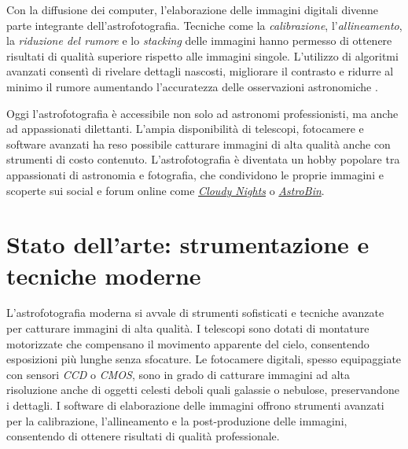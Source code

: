 Con la diffusione dei computer, l'elaborazione delle immagini digitali divenne parte integrante dell'astrofotografia. Tecniche come la \textit{calibrazione}, l'\textit{allineamento}, la \textit{riduzione del rumore} e lo \textit{stacking} delle immagini hanno permesso di ottenere risultati di qualità superiore rispetto alle immagini singole. L'utilizzo di algoritmi avanzati consentì di rivelare dettagli nascosti, migliorare il  contrasto e ridurre al minimo il rumore aumentando l'accuratezza delle osservazioni astronomiche \cite{calibration}.

Oggi l'astrofotografia è accessibile non solo ad astronomi professionisti, ma anche ad appassionati dilettanti. L'ampia disponibilità di telescopi, fotocamere e software avanzati ha reso possibile catturare immagini di alta qualità anche con strumenti di costo contenuto. L'astrofotografia è diventata un hobby popolare tra appassionati di astronomia e fotografia, che condividono le proprie immagini e scoperte sui social e forum online come \textit{\href{https://www.cloudynights.com/index}{Cloudy Nights}} o \textit{\href{https://www.astrobin.com}{AstroBin}}.

\section{Stato dell'arte: strumentazione e tecniche moderne} \label{sec:state_of_the_art}

L'astrofotografia moderna si avvale di strumenti sofisticati e tecniche avanzate per catturare immagini di alta qualità. I telescopi sono dotati di montature motorizzate che compensano il movimento apparente del cielo, consentendo esposizioni più lunghe senza sfocature. Le fotocamere digitali, spesso equipaggiate con sensori \textit{CCD} o \textit{CMOS}, sono in grado di catturare immagini ad alta risoluzione anche di oggetti celesti deboli quali galassie o nebulose, preservandone i dettagli. I software di elaborazione delle immagini offrono strumenti avanzati per la calibrazione, l'allineamento e la post-produzione delle immagini, consentendo di ottenere risultati di qualità professionale.

